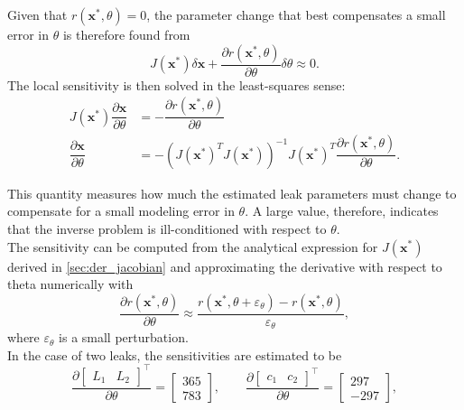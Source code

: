 Given that $r(\mathbf{x}^\ast,\theta)=0$, the parameter change that best compensates a small error in $\theta$ is therefore found from
\begin{equation*}
    J(\mathbf{x}^\ast) \delta \mathbf{x}+\dfrac{\partial r(\mathbf{x^\ast},\theta)}{\partial \theta} \delta\theta \approx 0.
\end{equation*}
The local sensitivity is then solved in the least-squares sense:
\begin{align*}
    J(\mathbf{x}^\ast)\dfrac{\partial \mathbf{x}}{\partial \theta}
    &=
    - \dfrac{\partial r(\mathbf{x}^\ast,\theta)}{\partial \theta}\\
    \dfrac{\partial \mathbf{x}}{\partial \theta}
    &=
    -\left(J(\mathbf{x}^\ast)^T J(\mathbf{x}^\ast)\right)^{-1}
    J(\mathbf{x}^\ast)^T
    \dfrac{\partial r(\mathbf{x}^\ast,\theta)}{\partial \theta}.
\end{align*}

This quantity measures how much the estimated leak parameters must change to compensate for a small modeling error in $\theta$. A large value, therefore, indicates that the inverse problem is ill-conditioned with respect to $\theta$.\\

The sensitivity can be computed from the analytical expression for $J(\mathbf{x}^\ast)$ derived in \autoref{sec:der_jacobian} and approximating the derivative with respect to \gls{theta} numerically with
\begin{equation*}
    \dfrac{\partial r(\mathbf{x}^\ast,\theta)}{\partial \theta}
    \approx
    \dfrac{
        r(\mathbf{x}^\ast,\theta+\varepsilon_\theta)
        -
        r(\mathbf{x}^\ast,\theta)
    }{\varepsilon_\theta},
\end{equation*}
where $\varepsilon_\theta$ is a small perturbation.\\

In the case of two leaks, the sensitivities are estimated to be
\begin{equation*}
    \dfrac{\partial \begin{bmatrix}
        L_1 & L_2
    \end{bmatrix}^\top}{\partial \theta} = \begin{bmatrix}
        365 \\ 783
    \end{bmatrix},
    \qquad
    \dfrac{\partial \begin{bmatrix}
        c_1 & c_2
    \end{bmatrix}^\top}{\partial \theta} = \begin{bmatrix}
        297 \\ -297
    \end{bmatrix},
\end{equation*}

